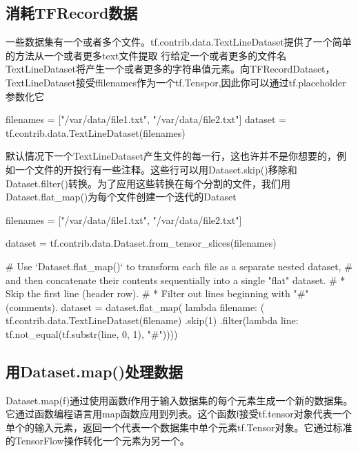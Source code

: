 \subsection{消耗TFRecord数据}
一些数据集有一个或者多个文件。tf.contrib.data.TextLineDataset提供了一个简单的方法从一个或者更多text文件提取
行给定一个或者更多的文件名TextLineDataset将产生一个或者更多的字符串值元素。向TFRecordDataset，TextLineDataset接受ffilenames作为一个tf.Tenspor,因此你可以通过tf.placeholder参数化它
\begin{python}
filenames = ["/var/data/file1.txt", "/var/data/file2.txt"]
dataset = tf.contrib.data.TextLineDataset(filenames)
\end{python}
默认情况下一个TextLineDataset产生文件的每一行，这也许并不是你想要的，例如一个文件的开投行有一些注释。这些行可以用Dataset.skip()移除和Dataset.filter()转换。为了应用这些转换在每个分割的文件，我们用Dataset.flat\_map()为每个文件创建一个迭代的Dataset
\begin{python}
filenames = ["/var/data/file1.txt", "/var/data/file2.txt"]

dataset = tf.contrib.data.Dataset.from_tensor_slices(filenames)

# Use `Dataset.flat\_map()` to transform each file as a separate nested dataset,
# and then concatenate their contents sequentially into a single "flat" dataset.
# * Skip the first line (header row).
# * Filter out lines beginning with "#" (comments).
dataset = dataset.flat_map(
    lambda filename: (
        tf.contrib.data.TextLineDataset(filename)
        .skip(1)
        .filter(lambda line: tf.not_equal(tf.substr(line, 0, 1), "#"))))
\end{python}
\subsection{用Dataset.map()处理数据}
Dataset.map(f)通过使用函数f作用于输入数据集的每个元素生成一个新的数据集。它通过函数编程语言用map函数应用到列表。这个函数f接受tf.tensor对象代表一个单个的输入元素，返回一个代表一个数据集中单个元素tf.Tensor对象。它通过标准的TensorFlow操作转化一个元素为另一个。
